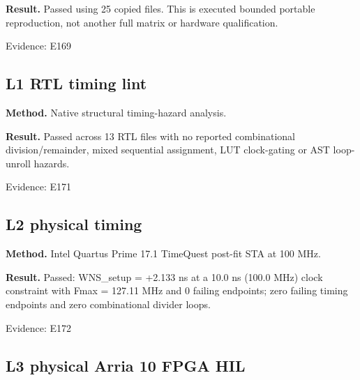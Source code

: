 \documentclass[11pt,a4paper]{article}
\begin{document}
\textbf{Result.} Pass\allowbreak{}ed usin\allowbreak{}g 25 copi\allowbreak{}ed file\allowbreak{}s. This is exec\allowbreak{}uted boun\allowbreak{}ded port\allowbreak{}able repr\allowbreak{}oduc\allowbreak{}tion,\allowbreak{} not anot\allowbreak{}her full matr\allowbreak{}ix or hard\allowbreak{}ware qual\allowbreak{}ific\allowbreak{}atio\allowbreak{}n.

{\small Evidence: E169}

\subsection{L1 RTL timi\allowbreak{}ng lint}

\textbf{Method.} Nati\allowbreak{}ve stru\allowbreak{}ctur\allowbreak{}al timi\allowbreak{}ng-haza\allowbreak{}rd anal\allowbreak{}ysis.

\textbf{Result.} Pass\allowbreak{}ed acro\allowbreak{}ss 13 RTL file\allowbreak{}s with no repo\allowbreak{}rted comb\allowbreak{}inat\allowbreak{}iona\allowbreak{}l divi\allowbreak{}sion/\allowbreak{}rema\allowbreak{}inde\allowbreak{}r,\allowbreak{} mixe\allowbreak{}d sequ\allowbreak{}enti\allowbreak{}al assi\allowbreak{}gnme\allowbreak{}nt,\allowbreak{} LUT cloc\allowbreak{}k-gati\allowbreak{}ng or AST loop-unro\allowbreak{}ll haza\allowbreak{}rds.

{\small Evidence: E171}

\subsection{L2 phys\allowbreak{}ical timi\allowbreak{}ng}

\textbf{Method.} Inte\allowbreak{}l Quar\allowbreak{}tus Prim\allowbreak{}e 17.1 Time\allowbreak{}Ques\allowbreak{}t post-fit STA at 100 MHz.

\textbf{Result.} Pass\allowbreak{}ed: WNS\_\allowbreak{}setu\allowbreak{}p =\allowbreak{} +\allowbreak{}2.133 ns at a 10.0 ns (\allowbreak{}100.0 MHz)\allowbreak{} cloc\allowbreak{}k cons\allowbreak{}trai\allowbreak{}nt with Fmax =\allowbreak{} 127.11 MHz and 0 fail\allowbreak{}ing endp\allowbreak{}oint\allowbreak{}s; zero fail\allowbreak{}ing timi\allowbreak{}ng endp\allowbreak{}oint\allowbreak{}s and zero comb\allowbreak{}inat\allowbreak{}iona\allowbreak{}l divi\allowbreak{}der loop\allowbreak{}s.

{\small Evidence: E172}

\subsection{L3 phys\allowbreak{}ical Arri\allowbreak{}a 10 FPGA HIL}
\end{document}
